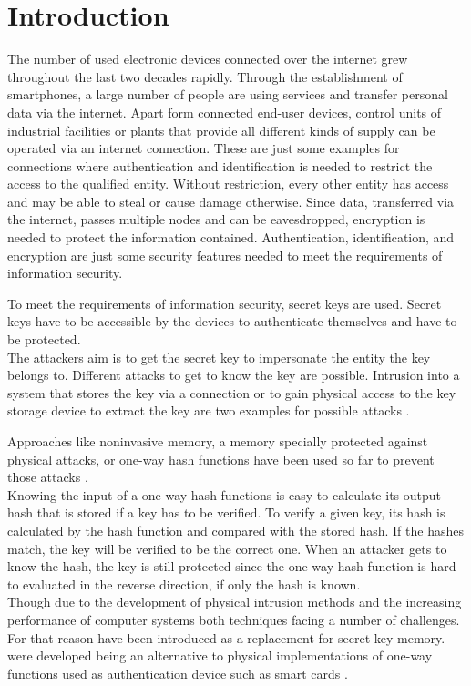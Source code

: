 \chapter{Introduction}

The number of used electronic devices connected over the internet grew throughout the last two decades rapidly.
Through the establishment of smartphones, a large number of people are using services and transfer personal data via the internet.
Apart form connected end-user devices, control units of industrial facilities or plants that provide all different kinds of supply can be operated via an internet connection.
These are just some examples for connections where authentication and identification is needed to restrict the access to the qualified entity.
Without restriction, every other entity has access and may be able to steal or cause damage otherwise.
Since data, transferred via the internet, passes multiple nodes and can be eavesdropped, encryption is needed to protect the information contained.
Authentication, identification, and encryption are just some security features needed to meet the requirements of information security.

\cite{2017InformationSecurity}

To meet the requirements of information security, secret keys are used.
Secret keys have to be accessible by the devices to authenticate themselves and have to be protected.\\
The attackers aim is to get the secret key to impersonate the entity the key belongs to.
Different attacks to get to know the key are possible.
Intrusion into a system that stores the key via a connection or to gain physical access to the key storage device to extract the key are two examples for possible attacks \cite{2016Attackcomputing,2017Side-channelAttack}.

Approaches like noninvasive memory, a memory specially protected against physical attacks, or one-way hash functions have been used so far to prevent those attacks \cite{Pappu2001PhysicalFunctions}.\\
Knowing the input of a one-way hash functions is easy to calculate its output hash that is stored if a key has to be verified.
To verify a given key, its hash is calculated by the hash function and compared with the stored hash.
If the hashes match, the key will be verified to be the correct one.
When an attacker gets to know the hash, the key is still protected since the one-way hash function is hard to evaluated in the reverse direction, if only the hash is known.\\
Though due to the development of physical intrusion methods and the increasing performance of computer systems both techniques facing a number of challenges.
For that reason \pufs have been introduced as a replacement for secret key memory.
\pufs were developed being an alternative to physical implementations of one-way functions used as authentication device such as smart cards \cite{Pappu2001PhysicalFunctions}.

